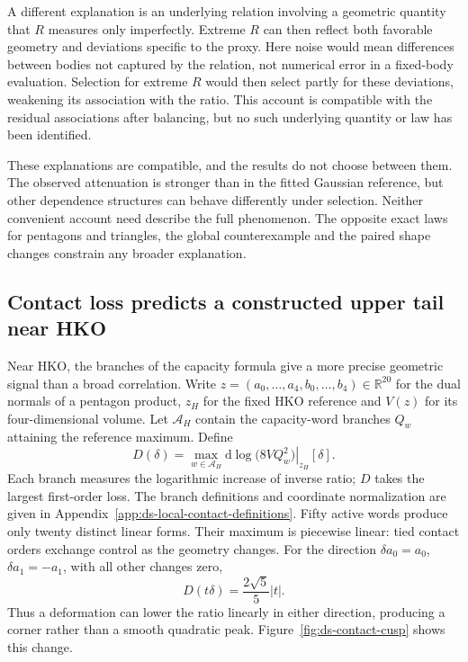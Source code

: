 A different explanation is an underlying relation involving a geometric
quantity that $R$ measures only imperfectly. Extreme $R$ can then reflect
both favorable geometry and deviations specific to the proxy. Here noise
would mean differences between bodies not captured by the relation, not
numerical error in a fixed-body evaluation. Selection for extreme $R$ would then select partly for these deviations,
weakening its association with the ratio. This account is compatible with
the residual associations after balancing, but no such underlying
quantity or law has been identified.

These explanations are compatible, and the results do not choose between
them. The observed attenuation is stronger than in the fitted Gaussian
reference, but other dependence structures can behave differently under
selection. Neither convenient account need describe the full phenomenon.
The opposite exact laws for pentagons and triangles, the global
counterexample and the paired shape changes constrain any broader
explanation.

\subsection{Contact loss predicts a constructed upper tail near HKO}
\label{subsec:ds-local-contact-loss}

Near HKO, the branches of the capacity formula give a more precise geometric
signal than a broad correlation. Write
$z=(a_0,\ldots,a_4,b_0,\ldots,b_4)\in\mathbb R^{20}$ for the dual normals
of a pentagon product, $z_H$ for the fixed HKO reference and $V(z)$ for its
four-dimensional volume. Let $\mathcal A_H$ contain the capacity-word branches
$Q_w$ attaining the reference maximum. Define
\[
 D(\delta)=\max_{w\in\mathcal A_H}
 \left.\mathrm d\log\bigl(8VQ_w^2\bigr)\right|_{z_H}[\delta].
\]
Each branch measures the logarithmic increase of inverse ratio; $D$ takes
the largest first-order loss. The branch definitions and coordinate
normalization are given in Appendix~\ref{app:ds-local-contact-definitions}.
Fifty active words produce only twenty distinct linear forms. Their maximum
is piecewise linear: tied contact orders exchange control as the geometry
changes. For the direction $\delta a_0=a_0$, $\delta a_1=-a_1$, with all
other changes zero,
\[
 D(t\delta)=\frac{2\sqrt5}{5}|t|.
\]
Thus a deformation can lower the ratio linearly in either direction,
producing a corner rather than a smooth quadratic peak. Figure~\ref{fig:ds-contact-cusp} shows this change.

